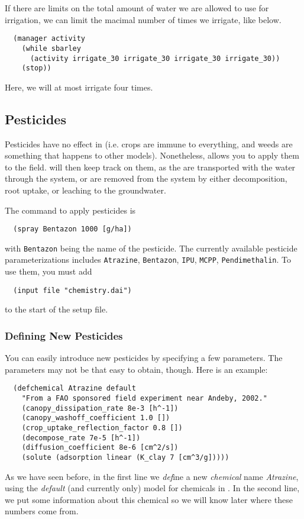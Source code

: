 \documentclass[a4paper,11pt]{article}
\begin{document}
If there are limits on the total amount of water we are allowed to use
for irrigation, we can limit the macimal number of times we irrigate,
like below.
\begin{verbatim}
  (manager activity
    (while sbarley
      (activity irrigate_30 irrigate_30 irrigate_30 irrigate_30))
    (stop))
\end{verbatim}
Here, we will at most irrigate four times.

\subsection{Pesticides}
\label{sec:pesticides}

Pesticides have no effect in \daisy{} (i.e. \daisy{} crops are immune
to everything, and weeds are something that happens to other models).
Nonetheless, \daisy{} allows you to apply them to the field.  \Daisy{}
will then keep track on them, as the are transported with the water
through the system, or are removed from the system by either
decomposition, root uptake, or leaching to the groundwater.

The command to apply pesticides is
\begin{verbatim}
  (spray Bentazon 1000 [g/ha])
\end{verbatim}
with \texttt{Bentazon} being the name of the pesticide.  The currently
available pesticide parameterizations includes \texttt{Atrazine},
\texttt{Bentazon}, \texttt{IPU}, \texttt{MCPP},
\texttt{Pendimethalin}.  To use them, you must add
\begin{verbatim}
  (input file "chemistry.dai")
\end{verbatim}
to the start of the setup file.

\subsubsection{Defining New Pesticides}

You can easily introduce new pesticides by specifying a few
parameters.  The parameters may not be that easy to obtain, though.
Here is an example:
\begin{verbatim}
  (defchemical Atrazine default
    "From a FAO sponsored field experiment near Andeby, 2002."
    (canopy_dissipation_rate 8e-3 [h^-1])
    (canopy_washoff_coefficient 1.0 [])
    (crop_uptake_reflection_factor 0.8 [])
    (decompose_rate 7e-5 [h^-1])
    (diffusion_coefficient 8e-6 [cm^2/s])
    (solute (adsorption linear (K_clay 7 [cm^3/g]))))
\end{verbatim}
As we have seen before, in the first line we \emph{def}ine a new
\emph{chemical} name \emph{Atrazine}, using the \emph{default} (and
currently only) model for chemicals in \daisy{}.  In the second line,
we put some information about this chemical so we will know later
where these numbers come from.
\end{document}
